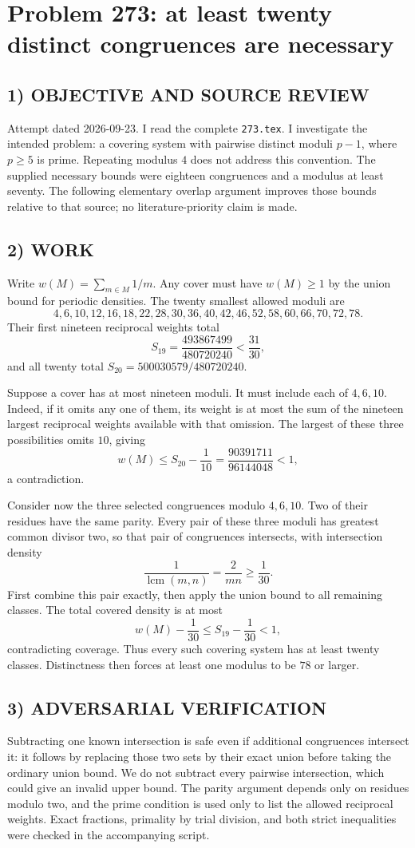 \section{Problem 273: at least twenty distinct congruences are necessary}
\subsection*{1) OBJECTIVE AND SOURCE REVIEW}
Attempt dated 2026-09-23. I read the complete \texttt{273.tex}. I investigate the intended problem: a covering system with pairwise distinct moduli $p-1$, where $p\ge5$ is prime. Repeating modulus $4$ does not address this convention. The supplied necessary bounds were eighteen congruences and a modulus at least seventy. The following elementary overlap argument improves those bounds relative to that source; no literature-priority claim is made.
\subsection*{2) WORK}
Write $w(M)=\sum_{m\in M}1/m$. Any cover must have $w(M)\ge1$ by the union bound for periodic densities. The twenty smallest allowed moduli are
\[
4,6,10,12,16,18,22,28,30,36,40,42,46,52,58,60,66,70,72,78.
\]
Their first nineteen reciprocal weights total
\[
S_{19}=\frac{493867499}{480720240}<\frac{31}{30},
\]
and all twenty total $S_{20}=500030579/480720240$.

Suppose a cover has at most nineteen moduli. It must include each of $4,6,10$. Indeed, if it omits any one of them, its weight is at most the sum of the nineteen largest reciprocal weights available with that omission. The largest of these three possibilities omits $10$, giving
\[
w(M)\le S_{20}-\frac1{10}
=\frac{90391711}{96144048}<1,
\]
a contradiction.

Consider now the three selected congruences modulo $4,6,10$. Two of their residues have the same parity. Every pair of these three moduli has greatest common divisor two, so that pair of congruences intersects, with intersection density
\[
\frac1{\operatorname{lcm}(m,n)}=\frac2{mn}\ge\frac1{30}.
\]
First combine this pair exactly, then apply the union bound to all remaining classes. The total covered density is at most
\[
w(M)-\frac1{30}\le S_{19}-\frac1{30}<1,
\]
contradicting coverage. Thus every such covering system has at least twenty classes. Distinctness then forces at least one modulus to be $78$ or larger.
\subsection*{3) ADVERSARIAL VERIFICATION}
Subtracting one known intersection is safe even if additional congruences intersect it: it follows by replacing those two sets by their exact union before taking the ordinary union bound. We do not subtract every pairwise intersection, which could give an invalid upper bound. The parity argument depends only on residues modulo two, and the prime condition is used only to list the allowed reciprocal weights. Exact fractions, primality by trial division, and both strict inequalities were checked in the accompanying script.
